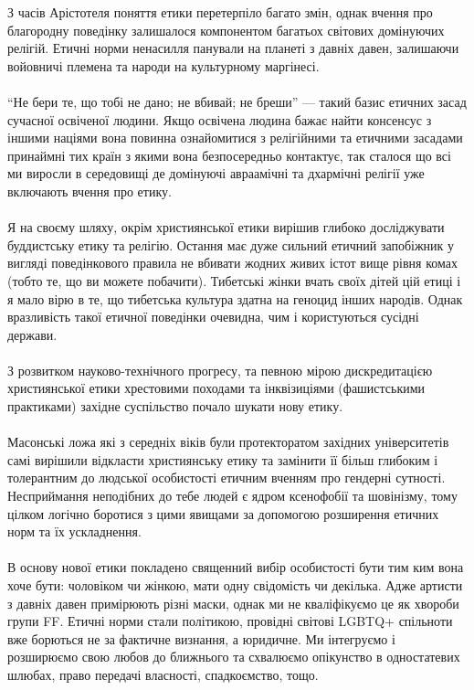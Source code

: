 З часів Арістотеля поняття етики перетерпіло багато змін, однак вчення про благородну поведінку залишалося компонентом багатьох світових домінуючих релігій. Етичні норми ненасилля панували на планеті з давніх давен, залишаючи войовничі племена та народи на культурному маргінесі.
\\
\\
“Не бери те, що тобі не дано; не вбивай; не бреши” — такий базис етичних засад сучасної освіченої людини. Якщо освічена людина бажає найти консенсус з іншими націями вона повинна ознайомитися з релігійними та етичними засадами принаймні тих країн з якими вона безпосередньо контактує, так сталося що всі ми виросли в середовищі де домінуючі авраамічні та дхармічні релігії уже включають вчення про етику.
\\
\\
Я на своєму шляху, окрім християнської етики вирішив глибоко досліджувати буддистську етику та релігію. Остання має дуже сильний етичний запобіжник у вигляді поведінкового правила не вбивати жодних живих істот вище рівня комах (тобто те, що ви можете побачити). Тибетські жінки вчать своїх дітей цій етиці і я мало вірю в те, що тибетська культура здатна на геноцид інших народів. Однак вразливість такої етичної поведінки очевидна, чим і користуються сусідні держави.
\\
\\
З розвитком науково-технічного прогресу, та певною мірою дискредитацією християнської етики хрестовими походами та інквізиціями (фашистськими практиками) західне суспільство почало шукати нову етику.
\\
\\
Масонські ложа які з середніх віків були протекторатом західних університетів самі вирішили відкласти християнську етику та замінити її більш глибоким і толерантним до людської особистості етичним вченням про гендерні сутності. Несприймання неподібних до тебе людей є ядром ксенофобії та шовінізму, тому цілком логічно боротися з цими явищами за допомогою розширення етичних норм та їх ускладнення.
\\
\\
В основу нової етики покладено священний вибір особистості бути тим ким вона хоче бути: чоловіком чи жінкою, мати одну свідомість чи декілька. Адже артисти з давніх давен примірюють різні маски, однак ми не кваліфікуємо це як хвороби групи FF. Етичні норми стали політикою, провідні світові LGBTQ+ спільноти вже борються не за фактичне визнання, а юридичне. Ми інтегруємо і розширюємо свою любов до ближнього та схвалюємо опікунство в одностатевих шлюбах, право передачі власності, спадкоємство, тощо.
